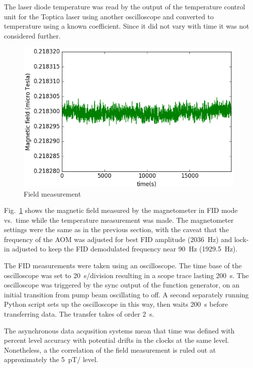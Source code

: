 The laser diode temperature was read by the output of the temperature
control unit for the Toptica laser using another oscilloscope and
converted to temperature using a known coefficient.  Since it did not
vary with time it was not considered further.

\begin{figure}%
\centering\includegraphics[width=0.8\linewidth]{figures/field_.png}
\caption{Field measurement\label{fig:field}}
\end{figure}

Fig.~\ref{fig:field} shows the magnetic field measured by the
magnetometer in FID mode vs.~time while the temperature measurement
was made.  The magnetometer settings were the same as in the previous
section, with the caveat that the frequency of the AOM was adjusted
for best FID amplitude (2036~Hz) and lock-in adjusted to keep the FID
demodulated frequency near 90~Hz (1929.5~Hz).

The FID measurements were taken using an oscilloscope.  The time base
of the oscilloscope was set to 20~s/division resulting in a scope
trace lasting 200~s.  The oscilloscope was triggered by the sync
output of the function generator, on an initial transition from pump
beam oscillating to off.  A second separately running Python script
sets up the oscilloscope in this way, then waits 200~s before
transferring data.  The transfer takes of order 2~s.

The asynchronous data acqusition systems mean that time was defined
with percent level accuracy with potential drifts in the clocks at the
same level.  Nonetheless, a the correlation of the field measurement
is ruled out at approximately the 5~pT/ level.



